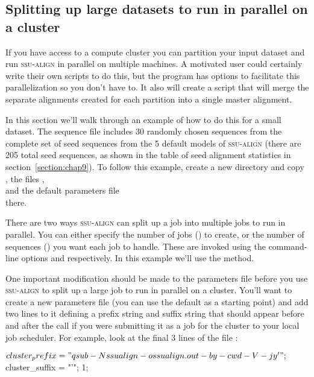 \subsection{Splitting up large datasets to run in parallel on a cluster}

If you have access to a compute cluster you can partition your input
dataset and run \textsc{ssu-align} in parallel on multiple machines. A
motivated user could certainly write their own scripts to do this, but
the  program has options to facilitate this
parallelization so you don't have to.  It also will create a script
that will merge the separate alignments created for each partition
into a single master alignment.

In this section we'll walk through an example of how to do this for a
small dataset.  The sequence file  includes
30 randomly chosen sequences from the complete set of seed sequences
from the 5 default models of \textsc{ssu-align} (there are 205 total
seed sequences, as shown in the table of seed alignment statistics in
section~\ref{section:chap9}). To follow this example, create a new
directory and copy , the files
,
\\  and the default parameters file
\\  there.

There are two ways \textsc{ssu-align} can split up a job into multiple
jobs to run in parallel. You can either specify the number of jobs
() to create, or the number of sequences () you
want each job to handle. These are invoked using the command-line
options  and  respectively.  In this example
we'll use the  method.

One important modification should be made to the parameters file
before you use \textsc{ssu-align} to split up a large job to run in
parallel on a cluster. You'll want to create a new parameters file
(you can use the default  as a starting point) and
add two lines to it defining a prefix string and suffix string that
should appear before and after the  call if you were
submitting it as a job for the cluster to your local job
scheduler. For example, look at the final 3 lines of the file
:

\begin{sreoutput}
$cluster_prefix = "qsub -N ssualign -o ssualign.out -b y -cwd -V -j y '";
$cluster_suffix = "'";
1;
\end{sreoutput}

